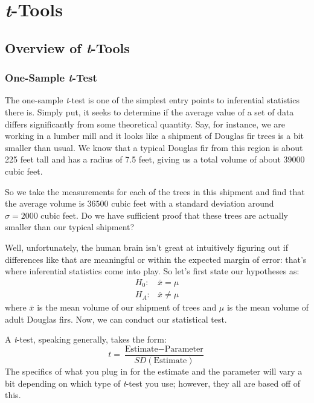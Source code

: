 
\chapter{\textit{t}-Tools}

\section{Overview of \textit{t}-Tools}

\subsection{One-Sample \textit{t}-Test}

The one-sample \textit{t}-test is one of the simplest entry points to inferential statistics there is. Simply put, it seeks to determine if the average value of a set of data differs significantly from some theoretical quantity. Say, for instance, we are working in a lumber mill and it looks like a shipment of Douglas fir trees is a bit smaller than usual. We know that a typical Douglas fir from this region is about 225 feet tall and has a radius of 7.5 feet, giving us a total volume of about $39000$ cubic feet.

So we take the measurements for each of the trees in this shipment and find that the average volume is $36500$ cubic feet with a standard deviation around $\sigma = 2000$ cubic feet. Do we have sufficient proof that these trees are actually smaller than our typical shipment?

Well, unfortunately, the human brain isn't great at intuitively figuring out if differences like that are meaningful or within the expected margin of error: that's where inferential statistics come into play. So let's first state our hypotheses as:
\begin{eqnarray*}
H_0:& \bar{x} = \mu\\
H_A:& \bar{x} \neq \mu
\end{eqnarray*}
where $\bar{x}$ is the mean volume of our shipment of trees and $\mu$ is the mean volume of adult Douglas firs. Now, we can conduct our statistical test.

A \textit{t}-test, speaking generally, takes the form:
\begin{equation}
t = \frac{\text{Estimate}-\text{Parameter}}{SD(\text{Estimate})}
\end{equation}
The specifics of what you plug in for the estimate and the parameter will vary a bit depending on which type of \textit{t}-test you use; however, they all are based off of this.

